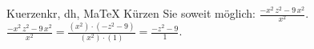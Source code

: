 \begin{MAufgabe}{Kuerzen}{kr, dh, MaTeX}
K\"urzen Sie soweit m\"oglich: $\frac{ - x^2\, z^2 - 9\, x^2}{x^2}$.\\ 
\ifLsg\MLoesung
\quad $\frac{ - x^2\, z^2 - 9\, x^2}{x^2}=\frac{(x^2)\cdot( - z^2 - 9)}{(x^2)\cdot(1)}=\frac{ - z^2 - 9}{1}$.\else\relax\fi
 \end{MAufgabe}